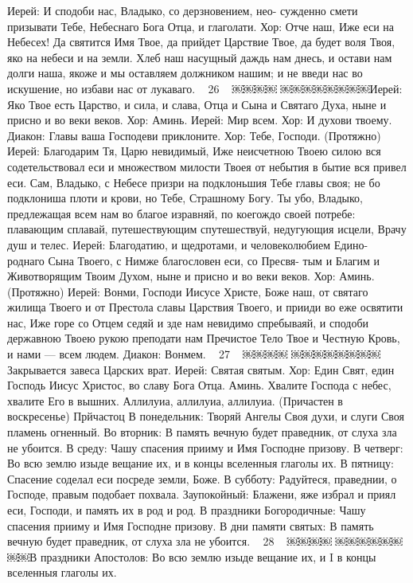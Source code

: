 Иерей: И сподоби нас, Владыко, со дерзновением, нео- сужденно смети призывати Тебе, Небеснаго Бога Отца, и глаголати.
Хор: Отче наш, Иже еси на Небесех! Да святится Имя Твое, да прийдет Царствие Твое, да будет воля Твоя, яко на небеси и на земли. Хлеб наш насущный даждь нам днесь, и остави нам долги наша, якоже и мы оставляем должником нашим; и не введи нас во искушение, но избави нас от лукаваго.
~ 26 ~
￼￼￼￼
￼￼￼￼￼￼￼￼Иерей: Яко Твое есть Царство, и сила, и слава, Отца и Сына и Святаго Духа, ныне и присно и во веки веков.
Хор: Аминь.
Иерей: Мир всем.
Хор: И духови твоему.
Диакон: Главы ваша Господеви приклоните.
Хор: Тебе, Господи. (Протяжно)
Иерей: Благодарим Тя, Царю невидимый, Иже неисчетною Твоею силою вся содетельствовал еси и множеством милости Твоея от небытия в бытие вся привел еси. Сам, Владыко, с Небесе призри на подклоньшия Тебе главы своя; не бо подклониша плоти и крови, но Тебе, Страшному Богу. Ты убо, Владыко, предлежащая всем нам во благое изравняй, по коегождо своей потребе: плавающим сплавай, путешествующим спутешествуй, недугующия исцели, Врачу душ и телес.
Иерей: Благодатию, и щедротами, и человеколюбием Едино- роднаго Сына Твоего, с Нимже благословен еси, со Пресвя- тым и Благим и Животворящим Твоим Духом, ныне и присно и во веки веков.
Хор: Аминь. (Протяжно)
Иерей: Вонми, Господи Иисусе Христе, Боже наш, от святаго жилища Твоего и от Престола славы Царствия Твоего, и прииди во еже освятити нас, Иже горе со Отцем седяй и зде нам невидимо спребываяй, и сподоби державною Твоею рукою преподати нам Пречистое Тело Твое и Честную Кровь, и нами — всем людем.
Диакон: Вонмем.
~ 27 ~
￼￼￼￼
￼￼￼￼￼￼￼￼Закрывается завеса Царских врат.
Иерей: Святая святым.
Хор: Един Свят, един Господь Иисус Христос, во славу Бога Отца. Аминь.
Хвалите Господа с небес, хвалите Его в вышних. Аллилуиа, аллилуиа, аллилуиа. (Причастен в воскресенье)
Прйчастоц
В понедельник:
Творяй Ангелы Своя духи, и слуги Своя пламень огненный.
Во вторник:
В память вечную будет праведник, от слуха зла не убоится.
В среду:
Чашу спасения прииму и Имя Господне призову.
В четверг:
Во всю землю изыде вещание их, и в концы вселенныя
глаголы их.
В пятницу:
Спасение соделал еси посреде земли, Боже.
В субботу:
Радуйтеся, праведнии, о Господе, правым подобает похвала.
Заупокойный:
Блажени, яже избрал и приял еси, Господи, и память их в род
и род.
В праздники Богородичные:
Чашу спасения прииму и Имя Господне призову.
В дни памяти святых:
В память вечную будет праведник, от слуха зла не убоится.
~ 28 ~
￼￼￼￼
￼￼￼￼￼￼￼￼В праздники Апостолов:
Во всю землю изыде вещание их, и I в концы вселенныя глаголы их.
